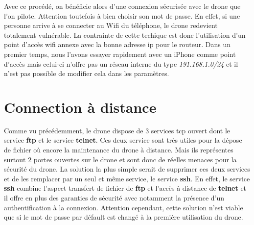 Avec ce procédé, on bénéficie alors d'une connexion sécurisée avec le drone que l'on pilote. Attention toutefois à bien choisir son mot de passe. En effet, si une personne arrive à se connecter au Wifi du téléphone, le drone redevient totalement vulnérable. La contrainte de cette techique est donc l'utilisation d'un point d'accès wifi annexe avec la bonne adresse ip pour le routeur. Dans un premier temps, nous l'avons essayer rapidement avec un iPhone comme point d'accès mais celui-ci n'offre pas un réseau interne du type \textit{191.168.1.0/24} et il n'est pas possible de modifier cela dans les paramètres.

\section{Connection à distance}
Comme vu précédemment, le drone dispose de 3 services tcp ouvert dont le service \textbf{ftp} et le service \textbf{telnet}. Ces deux service sont très utiles pour la dépose de fichier où encore la maintenance du drone à distance. Mais ils représentes surtout 2 portes ouvertes sur le drone et sont donc de réelles menaces pour la sécurité du drone.
La solution la plus simple serait de supprimer ces deux services et de les remplacer par un seul et même service, le service \textbf{ssh}. En effet, le service \textbf{ssh} combine l'aspect transfert de fichier de \textbf{ftp} et l'accès à distance de \textbf{telnet} et il offre en plus des garanties de sécurité avec notamment la présence d'un authentification à la connexion. Attention cependant, cette solution n'est viable que si le mot de passe par défault est changé à la première utilisation du drone. 
